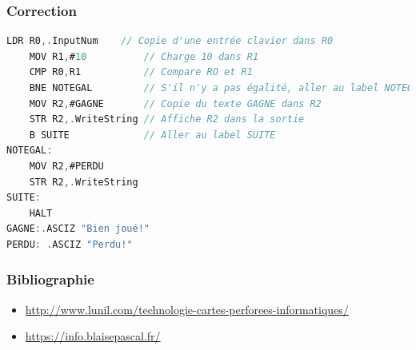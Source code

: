\documentclass[svgnames,11pt]{beamer}
\begin{document}
\begin{frame}[fragile]
    \frametitle{Correction}
\begin{center}
\begin{lstlisting}[language=C , basicstyle=\small, xleftmargin=1em, xrightmargin=1em]
    LDR R0,.InputNum    // Copie d'une entrée clavier dans R0
    MOV R1,#10          // Charge 10 dans R1
    CMP R0,R1           // Compare RO et R1
    BNE NOTEGAL         // S'il n'y a pas égalité, aller au label NOTEGAL
    MOV R2,#GAGNE       // Copie du texte GAGNE dans R2
    STR R2,.WriteString // Affiche R2 dans la sortie
    B SUITE             // Aller au label SUITE
NOTEGAL:
    MOV R2,#PERDU
    STR R2,.WriteString
SUITE:
    HALT
GAGNE:.ASCIZ "Bien joué!"
PERDU: .ASCIZ "Perdu!"
\end{lstlisting}
\end{center}

\end{frame}
\begin{frame}
    \frametitle{Bibliographie}

    {\small
        \begin{itemize}
            \item \url{http://www.lunil.com/technologie-cartes-perforees-informatiques/}
            \item \url{https://info.blaisepascal.fr/}
        \end{itemize}}

\end{frame}
\end{document}
